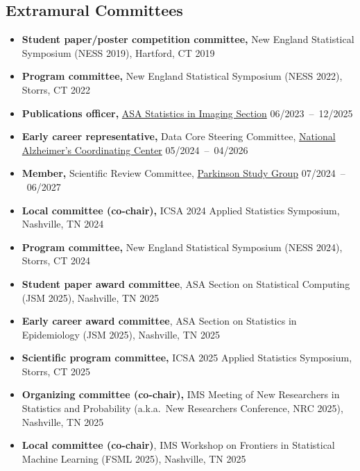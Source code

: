 \documentclass[12pt]{article}
\begin{document}
	\subsection*{Extramural Committees}
	\begin{itemize}
		\item {\bf Student paper/poster competition committee,} New 
		England Statistical Symposium (NESS 2019), Hartford, CT 
		\hfill 2019
		\item {\bf Program committee,} New England Statistical 
		Symposium (NESS 2022), Storrs, CT \hfill 2022
		\item {\bf Publications officer,} 
		\href{https://www.statsinimaging.org/}{ASA Statistics in Imaging 
		Section} \hfill \mbox{06/2023 -- 12/2025}
		\item {\bf Early career representative,} Data Core Steering Committee, 
		\href{https://naccdata.org/}{National Alzheimer's Coordinating Center} 
		\hfill \mbox{05/2024 -- 04/2026}
		\item {\bf Member,} Scientific Review Committee, 
		\href{https://parkinson-study-group.org/}{Parkinson Study Group} \hfill 
		\mbox{07/2024 -- 06/2027}
		\item {\bf Local committee (co-chair),} ICSA 2024 Applied 
		Statistics Symposium, Nashville, TN \hfill \mbox{2024}
		\item {\bf Program committee,} New England Statistical 
		Symposium (NESS 2024), Storrs, CT \hfill 2024
		\item {\bf Student paper award committee}, ASA Section 
		on Statistical Computing (JSM 2025), Nashville, TN \hfill 2025
		\item {\bf Early career award committee}, ASA Section on 
		Statistics in Epidemiology (JSM 2025), Nashville, TN \hfill 
		2025
		\item {\bf Scientific program committee,} ICSA 2025 
		Applied Statistics Symposium, Storrs, CT \hfill \mbox{2025}
		\item {\bf Organizing committee (co-chair),} IMS Meeting of 
		New Researchers in Statistics and Probability (a.k.a.\ New 
		Researchers Conference, NRC 2025), Nashville, TN \hfill 2025
		\item {\bf Local committee (co-chair)}, IMS Workshop on 
		Frontiers in Statistical Machine Learning (FSML 2025), 
		Nashville, TN 
		\hfill 2025 
	\end{itemize}
	
\end{document}
